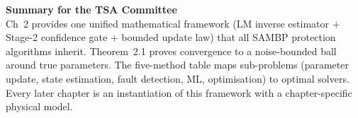 \documentclass[12pt,a4paper]{article}
\begin{document}
\vspace{1em}
\begin{tcolorbox}[colback=iitmnavy!5,colframe=iitmnavy,arc=3pt,boxrule=1pt]
\small\centering
\textbf{Summary for the TSA Committee}\\[3pt]
Ch~2 provides one unified mathematical framework (LM inverse estimator + Stage-2
confidence gate + bounded update law) that all SAMBP protection algorithms inherit.
Theorem~2.1 proves convergence to a noise-bounded ball around true parameters.
The five-method table maps sub-problems (parameter update, state estimation, fault
detection, ML, optimisation) to optimal solvers.  Every later chapter is an
instantiation of this framework with a chapter-specific physical model.
\end{tcolorbox}
\end{document}
